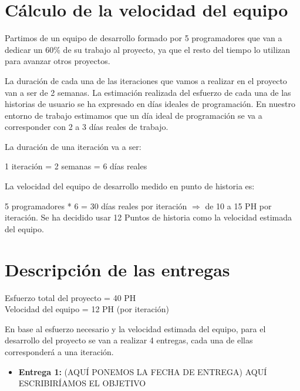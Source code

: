 \documentclass[11pt]{article}
\begin{document}
\section{Cálculo de la velocidad del equipo}
Partimos de un equipo de desarrollo formado  por 5 programadores  que van a dedicar un 60\% de su trabajo al proyecto, ya que el resto del tiempo lo utilizan para avanzar otros proyectos. 

La duración de cada una de las iteraciones que vamos a realizar en el proyecto van a ser de 2 semanas. 
La estimación realizada del esfuerzo de cada una de las historias de usuario se ha expresado en días ideales de programación. En nuestro
entorno de trabajo estimamos que un día ideal de programación se va a corresponder con 2 a 3 días reales de trabajo. 

La duración de una iteración va a ser: 

1 iteración = 2 semanas = 6 días reales 

La velocidad del equipo de desarrollo medido en punto de historia es:  

5 programadores * 6 = 30 días reales por iteración $\Longrightarrow$ de 10 a 15 PH por iteración.  
Se ha decidido usar 12 Puntos de historia como la velocidad estimada del equipo. 

\section{Descripción de las entregas}

Esfuerzo total del proyecto = 40 PH \\
Velocidad del equipo = 12 PH (por iteración) 

En base al esfuerzo necesario y la velocidad estimada del equipo, para el desarrollo del proyecto se van a realizar 4 entregas, cada una de ellas corresponderá a una iteración.
\begin{itemize}
\item \textbf{Entrega 1:} (AQUÍ PONEMOS LA FECHA DE ENTREGA) AQUÍ ESCRIBIRÍAMOS EL OBJETIVO
\end{itemize}
\end{document}
